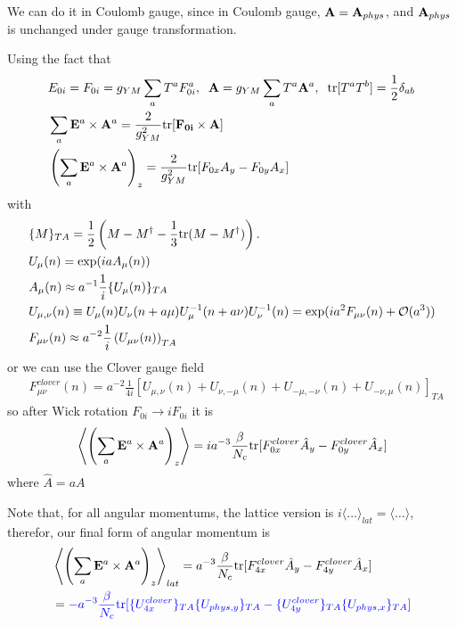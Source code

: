 We can do it in Coulomb gauge, since in Coulomb gauge, ${\bf A}={\bf A}_{phys}$, and ${\bf A}_{phys}$ is unchanged under gauge transformation.

Using the fact that
\begin{equation}
\begin{split}
&E_{0i}=F_{0i}=g_{YM}\sum _aT^a F^a_{0i},\;\;{\bf A}=g_{YM}\sum _{a}T^a{\bf A}^a,\;\;{\rm tr}[T^aT^b]=\frac{1}{2}\delta _{ab}\\
&\sum _a {\bf E}^a \times {\bf A}^a=\frac{2}{g^2_{YM}}{\rm tr}[{\bf F_{0i}}\times {\bf A}]\\
&\left(\sum _a {\bf E}^a \times {\bf A}^a\right)_z=\frac{2}{g^2_{YM}}{\rm tr}[F_{0x} A_y -F_{0y} A_x]\\
\end{split}
\end{equation}
with
\begin{equation}
\begin{split}
&\{M\}_{TA}=\frac{1}{2}\left(M-M^{\dagger}-\frac{1}{3}{\rm tr}(M-M^{\dagger})\right).\\
&U_{\mu}(n)=\exp (iaA_{\mu}(n))\\
&A_{\mu}(n)\approx a^{-1}\frac{1}{i}\{U_{\mu}(n)\}_{TA}\\
&U_{\mu, \nu}(n)\equiv U_{\mu}(n)U_{\nu}(n+a\mu)U^{-1}_{\mu}(n+a\nu)U^{-1}_{\nu}(n)=\exp (ia^2F_{\mu\nu}(n)+\mathcal{O}(a^3))\\
&F_{\mu\nu}(n)\approx a^{-2}\frac{1}{i}\left(U_{\mu\nu}(n)\right)_{TA}\\
\end{split}
\end{equation}
or we can use the Clover gauge field
\begin{equation}
\begin{split}
&F^{clover}_{\mu\nu}(n)=a^{-2}\frac{1}{4i}\left[U_{\mu,\nu}(n)+U_{\nu,-\mu}(n)+U_{-\mu,-\nu}(n)+U_{-\nu,\mu}(n)\right]_{TA}
\end{split}
\end{equation}
so after Wick rotation $F_{0i}\to iF_{0i}$ it is
\begin{equation}
\begin{split}
&\left\langle \left(\sum _a {\bf E}^a \times {\bf A}^a\right)_z\right\rangle =ia^{-3}\frac{\beta}{N_c} {\rm tr}[F^{clover}_{0x} \hat{A}_y - F^{clover}_{0y}\hat{A}_x]\\
\end{split}
\end{equation}
where $\hat{A}=aA$

Note that, for all angular momentums, the lattice version is $i\langle \ldots \rangle _{lat}=\langle \ldots \rangle $, therefor, our final form of angular momentum is
\begin{equation}
\begin{split}
&\left\langle \left(\sum _a {\bf E}^a \times {\bf A}^a\right)_z\right\rangle _{lat} =a^{-3}\frac{\beta}{N_c} {\rm tr}[F^{clover}_{4x} \hat{A}_y -F^{clover}_{4y} \hat{A}_x]\\
&=\textcolor[rgb]{0,0,1}{-a^{-3}\frac{\beta}{N_c} {\rm tr}[\{U^{clover}_{4x}\}_{TA} \{U_{phys,y}\}_{TA} -\{U^{clover}_{4y}\}_{TA} \{U_{phys,x}\}_{TA}]}
\end{split}
\end{equation}

